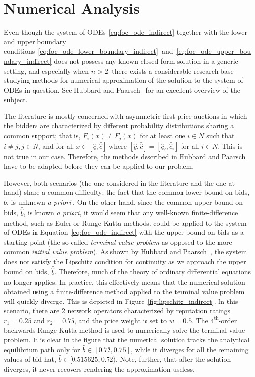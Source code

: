 \section{Numerical Analysis} %
\label{sec:numerical_analysis_indirect}
Even though the system of ODEs~\eqref{eq:foc_ode_indirect} together with the lower and upper boundary conditions~\eqref{eq:foc_ode_lower_boundary_indirect}~and~\eqref{eq:foc_ode_upper_boundary_indirect} does not possess any known closed-form solution in a generic setting, and especially when $n>2$, there exists a considerable research base studying methods for numerical approximation of the solution to the system of ODEs in question. See Hubbard and Paarsch~\cite{HubbardPaarsch2011} for an excellent overview of the subject.

The literature is mostly concerned with asymmetric first-price auctions in which the bidders are characterized by different probability distributions sharing a common support; that is, $F_i(x)\neq F_j(x)$ for at least one $i\in N$ such that $i\neq j, j\in N$, and for all $x\in [\underline{\hat{c}}, \bar{\hat{c}}]$ where $[\underline{\hat{c}}, \bar{\hat{c}}] = [\underline{\hat{c}}_i, \bar{\hat{c}}_i]$ for all $i\in N$. This is not true in our case. Therefore, the methods described in Hubbard and Paarsch~\cite{HubbardPaarsch2011} have to be adapted before they can be applied to our problem.

However, both scenarios (the one considered in the literature and the one at hand) share a common difficulty: the fact that the common lower bound on bids, $\underline{\hat{b}}$, is unknown \emph{a priori} \cite{HubbardPaarsch2011}. On the other hand, since the common upper bound on bids, $\bar{\hat{b}}$, is known \emph{a priori}, it would seem that any well-known finite-difference method, such as Euler or Runge-Kutta methods, could be applied to the system of ODEs in Equation~\eqref{eq:foc_ode_indirect} with the upper bound on bids as a starting point (the so-called \emph{terminal value problem} as opposed to the more common \emph{initial value problem}). As shown by Hubbard and Paarsch~\cite{HubbardPaarsch2011}, the system does not satisfy the Lipschitz condition for continuity as we approach the upper bound on bids, $\bar{\hat{b}}$. Therefore, much of the theory of ordinary differential equations no longer applies. In practice, this effectively means that the numerical solution obtained using a finite-difference method applied to the terminal value problem will quickly diverge. This is depicted in Figure~\ref{fig:lipschitz_indirect}. In this scenario, there are 2 network operators characterized by reputation ratings $r_1 = 0.25$ and $r_2 = 0.75$, and the price weight is set to $w=0.5$. The $4^{\textrm{th}}$-order backwards Runge-Kutta method is used to numerically solve the terminal value problem. It is clear in the figure that the numerical solution tracks the analytical equilibrium path only for $\hat{b}\in [0.72, 0.75]$, while it diverges for all the remaining values of bid-hat, $\hat{b}\in [0.515625, 0.72)$. Note, further, that after the solution diverges, it never recovers rendering the approximation useless.

